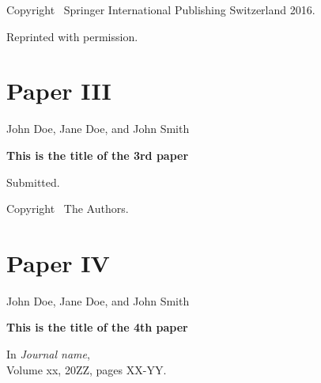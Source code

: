 \documentclass[officiallayout]{tktla}
\begin{document}
\vspace{60pt}
\noindent Copyright \textcopyright\ Springer International Publishing Switzerland 2016.

\noindent Reprinted with permission.

\cleardoublepage
%



\chapter*{Paper III}\thispagestyle{empty}


\vspace{80pt}
John Doe, Jane Doe, and John Smith

\vspace{10pt}
\noindent\textbf{This is the title of the 3rd paper}

\vspace{10pt}
\noindent Submitted.

\vspace{60pt}
\noindent
Copyright \textcopyright\ The Authors.

\cleardoublepage
%





\chapter*{Paper IV}\thispagestyle{empty}


\vspace{80pt}
John Doe, Jane Doe, and John Smith

\vspace{10pt}
\noindent\textbf{This is the title of the 4th paper}

\vspace{10pt}
\noindent
In \emph{Journal name}, \\Volume xx, 20ZZ, pages XX-YY.
\end{document}
